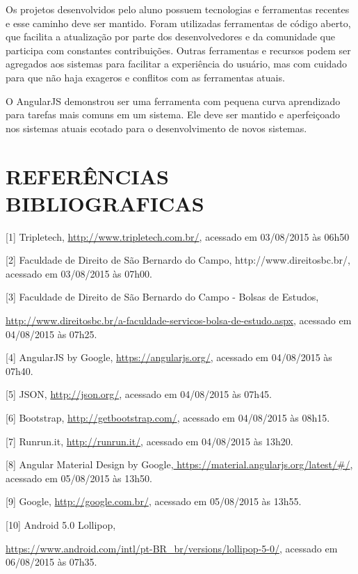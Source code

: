 \documentclass[
  12pt,				%
  openany,
  oneside,
  a4paper,			%
  english,			%
  brazil
]{article}
\numberwithin{figure}{section}
\numberwithin{table}{section}
\begin{document}
Os projetos desenvolvidos pelo aluno possuem tecnologias e ferramentas recentes e esse caminho deve ser mantido. Foram utilizadas ferramentas de código aberto, que facilita a atualização por parte dos desenvolvedores e da comunidade que participa com constantes contribuições. Outras ferramentas e recursos podem ser agregados aos sistemas para facilitar a experiência do usuário, mas com cuidado para que não haja exageros e conflitos com as ferramentas atuais.

O AngularJS demonstrou ser uma ferramenta com pequena curva aprendizado para tarefas mais comuns em um sistema. Ele deve ser mantido e aperfeiçoado nos sistemas atuais ecotado para o desenvolvimento de novos sistemas.


\section{REFERÊNCIAS BIBLIOGRAFICAS}



[1] Tripletech, \url{http://www.tripletech.com.br/}, acessado em 03/08/2015 às 06h50

[2] Faculdade de Direito de São Bernardo do Campo, http://www.direitosbc.br/, acessado em 03/08/2015 às 07h00.

[3] Faculdade de Direito de São Bernardo do Campo - Bolsas de Estudos,

\url{http://www.direitosbc.br/a-faculdade-servicos-bolsa-de-estudo.aspx}, acessado em 04/08/2015 às 07h25.

[4] AngularJS by Google, \url{https://angularjs.org/}, acessado em 04/08/2015 às 07h40.

[5] JSON, \url{http://json.org/}, acessado em 04/08/2015 às 07h45.

[6] Bootstrap, \url{http://getbootstrap.com/}, acessado em 04/08/2015 às 08h15.

[7] Runrun.it, \url{http://runrun.it/}, acessado em 04/08/2015 às 13h20.

[8] Angular Material Design by Google,\url{ https://material.angularjs.org/latest/\#/}, acessado em 05/08/2015 às 13h50.

[9] Google, \url{http://google.com.br/}, acessado em 05/08/2015 às 13h55.

[10] Android 5.0 Lollipop,

\url{https://www.android.com/intl/pt-BR_br/versions/lollipop-5-0/},
acessado em 06/08/2015 às 07h35.
\end{document}
